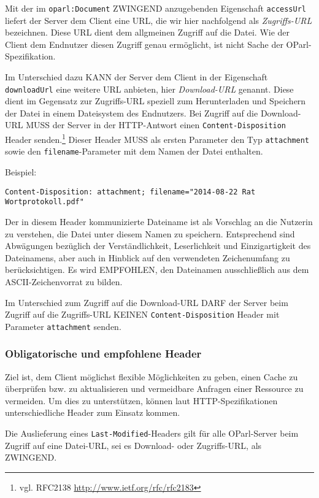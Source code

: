 \documentclass[,a4paper]{article}
\begin{document}
Mit der im \texttt{oparl:Document} ZWINGEND anzugebenden Eigenschaft
\texttt{accessUrl} liefert der Server dem Client eine URL, die wir hier
nachfolgend als \emph{Zugriffs-URL} bezeichnen. Diese URL dient dem
allgmeinen Zugriff auf die Datei. Wie der Client dem Endnutzer diesen
Zugriff genau ermöglicht, ist nicht Sache der OParl-Spezifikation.

Im Unterschied dazu KANN der Server dem Client in der Eigenschaft
\texttt{downloadUrl} eine weitere URL anbieten, hier \emph{Download-URL}
genannt. Diese dient im Gegensatz zur Zugriffs-URL speziell zum
Herunterladen und Speichern der Datei in einem Dateisystem des
Endnutzers. Bei Zugriff auf die Download-URL MUSS der Server in der
HTTP-Antwort einen \texttt{Content-Disposition} Header senden.\footnote{vgl.
  RFC2138 \url{http://www.ietf.org/rfc/rfc2183}} Dieser Header MUSS als
ersten Parameter den Typ \texttt{attachment} sowie den
\texttt{filename}-Parameter mit dem Namen der Datei enthalten.

Beispiel:

\begin{verbatim}
Content-Disposition: attachment; filename="2014-08-22 Rat Wortprotokoll.pdf"
\end{verbatim}

Der in diesem Header kommunizierte Dateiname ist als Vorschlag an die
Nutzerin zu verstehen, die Datei unter diesem Namen zu speichern.
Entsprechend sind Abwägungen bezüglich der Verständlichkeit,
Leserlichkeit und Einzigartigkeit des Dateinamens, aber auch in Hinblick
auf den verwendeten Zeichenumfang zu berücksichtigen. Es wird EMPFOHLEN,
den Dateinamen ausschließlich aus dem ASCII-Zeichenvorrat zu bilden.

Im Unterschied zum Zugriff auf die Download-URL DARF der Server beim
Zugriff auf die Zugriffs-URL KEINEN \texttt{Content-Disposition} Header
mit Parameter \texttt{attachment} senden.

\subsubsection{Obligatorische und empfohlene
Header}\label{obligatorische-und-empfohlene-header}

Ziel ist, dem Client möglichst flexible Möglichkeiten zu geben, einen
Cache zu überprüfen bzw. zu aktualisieren und vermeidbare Anfragen einer
Ressource zu vermeiden. Um dies zu unterstützen, können laut
HTTP-Spezifikationen unterschiedliche Header zum Einsatz kommen.

Die Auslieferung eines \texttt{Last-Modified}-Headers gilt für alle
OParl-Server beim Zugriff auf eine Datei-URL, sei es Download- oder
Zugriffs-URL, als ZWINGEND.
\end{document}
